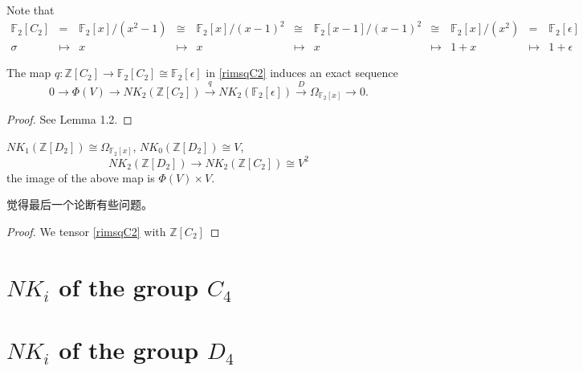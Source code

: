Note that 
\begin{align*}
\mathbb{F}_2[C_2]&=&\mathbb{F}_2[x]/(x^2-1) &\cong& \mathbb{F}_2[x]/(x-1)^2 &\cong& \mathbb{F}_2[x-1]/(x-1)^2 &\cong& \mathbb{F}_2[x]/(x^2)&=& \mathbb{F}_2[\epsilon] \\
\sigma \quad& \mapsto& x \qquad  & \mapsto& x \qquad & \mapsto& x \quad\qquad & \mapsto& 1+x \quad & \mapsto& 1+\epsilon
\end{align*}

\begin{lemma}
	The map $q \colon \mathbb{Z}[C_2] \longrightarrow \mathbb{F}_2[C_2] \cong \mathbb{F}_2[\epsilon]$ in \ref{rimsqC2} induces an exact sequence
	\[0\longrightarrow \Phi(V) \longrightarrow NK_2(\mathbb{Z}[C_2])\overset{q}\longrightarrow NK_2(\mathbb{F}_2[\epsilon])\overset{D}\longrightarrow \Omega_{\mathbb{F}_2[x]}\longrightarrow 0.\]
\end{lemma}
\begin{proof}
	See \cite{weibel2009nk0} Lemma 1.2.
\end{proof}
\begin{theorem}
	$NK_1(\mathbb{Z}[D_2]) \cong \Omega_{\mathbb{F}_2[x]}$, $NK_0(\mathbb{Z}[D_2])\cong V$,
	\[NK_2(\mathbb{Z}[D_2]) \longrightarrow NK_2(\mathbb{Z}[C_2])\cong V^2\]
	the image of the above map is $\Phi(V) \times V$.
\end{theorem}
觉得最后一个论断有些问题。
\begin{proof}
	We tensor \ref{rimsqC2} with $\mathbb{Z}[C_2]$

\end{proof}



\section{\texorpdfstring{$NK_i$}{NKi} of the group \texorpdfstring{$C_4$}{C4}}
\label{sec:C4}
\section{\texorpdfstring{$NK_i$}{NKi} of the group \texorpdfstring{$D_4$}{D4}}
\label{sec:D4}